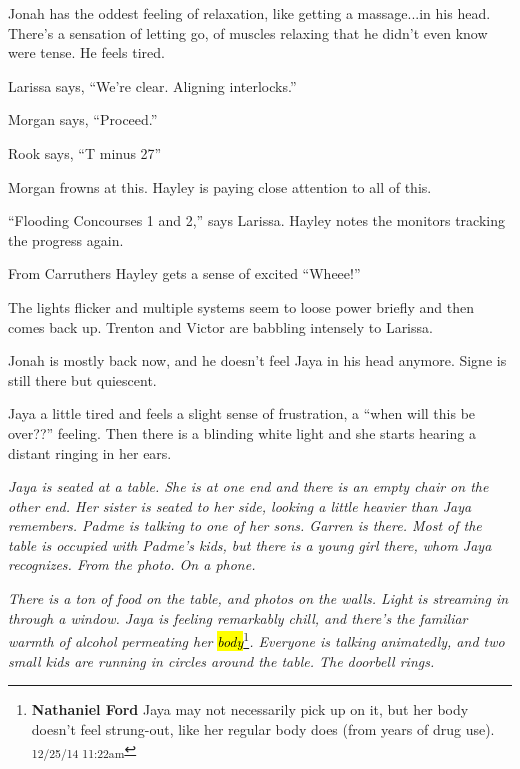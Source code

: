 Jonah has the oddest feeling of relaxation, like getting a massage...in his head. There's a sensation of letting go, of muscles relaxing that he didn't even know were tense.  He feels tired.





Larissa says, ``We're clear.  Aligning interlocks.''

Morgan says, ``Proceed.''

Rook says, ``T minus 27''

Morgan frowns at this.  Hayley is paying close attention to all of this.

``Flooding Concourses 1 and 2,'' says Larissa.  Hayley notes the monitors tracking the progress again.  

From Carruthers Hayley gets a sense of excited ``Wheee!''



The lights flicker and multiple systems seem to loose power briefly and then comes back up.  Trenton and Victor are babbling intensely to Larissa.



Jonah is mostly back now, and he doesn't feel Jaya in his head anymore.  Signe is still there but quiescent. 





Jaya a little tired and feels a slight sense of frustration, a ``when will this be over??'' feeling.  Then there is a blinding white light and she starts hearing a distant ringing in her ears.





\textit{Jaya is seated at a table. She is at one end and there is an empty chair on the other end.  Her sister is seated to her side, looking a little heavier than Jaya remembers.  Padme is talking to one of her sons.  Garren is there.  Most of the table is occupied with Padme's kids, but there is a young girl there, whom Jaya recognizes.  From the photo.  On a phone.}



\textit{There is a ton of food on the table, and photos on the walls.  Light is streaming in through a window.  Jaya is feeling remarkably chill, and there's the familiar warmth of alcohol permeating her }\textit{\hl{body}}\footnote{\textbf{Nathaniel Ford }Jaya may not necessarily pick up on it, but her body doesn't feel strung-out, like her regular body does (from years of drug use). \textsubscript{12/25/14 11:22am}}\textit{.  Everyone is talking animatedly, and two small kids are running in circles around the table.  The doorbell rings.}



